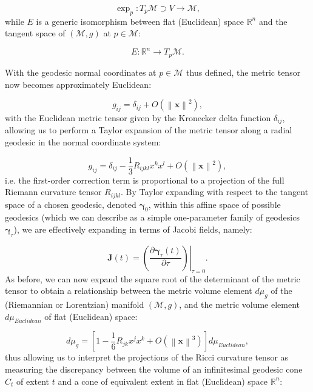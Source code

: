 \documentclass{article}
\begin{document}
\begin{equation}
\exp_p : T_p \mathcal{M} \supset V \to \mathcal{M},
\end{equation}
while $E$ is a generic isomorphism between flat (Euclidean) space ${\mathbb{R}^n}$ and the tangent space of ${\left( \mathcal{M}, g \right)}$ at ${p \in \mathcal{M}}$:

\begin{equation}
E : \mathbb{R}^n \to T_p \mathcal{M}.
\end{equation}

With the geodesic normal coordinates at ${p \in \mathcal{M}}$ thus defined, the metric tensor now becomes approximately Euclidean:

\begin{equation}
g_{i j} = \delta_{i j} + O \left( \left\lVert \mathbf{x} \right\rVert^2 \right),
\end{equation}
with the Euclidean metric tensor given by the Kronecker delta function ${\delta_{i j}}$, allowing us to perform a Taylor expansion of the metric tensor along a radial geodesic in the normal coordinate system:

\begin{equation}
g_{i j} = \delta_{i j} - \frac{1}{3} R_{i j k l} x^k x^l + O \left( \left\lVert \mathbf{x} \right\rVert^2 \right),
\end{equation}
i.e. the first-order correction term is proportional to a projection of the full Riemann curvature tensor ${R_{i j k l}}$. By Taylor expanding with respect to the tangent space of a chosen geodesic, denoted ${\boldsymbol\gamma_0}$, within this affine space of possible geodesics (which we can describe as a simple one-parameter family of geodesics ${\boldsymbol\gamma_{\tau}}$), we are effectively expanding in terms of Jacobi fields, namely:

\begin{equation}
\mathbf{J} \left( t \right) = \left. \left( \frac{\partial \boldsymbol\gamma_{\tau} \left( t \right)}{\partial \tau} \right) \right\rvert_{\tau = 0}.
\end{equation}
As before, we can now expand the square root of the determinant of the metric tensor to obtain a relationship between the metric volume element ${d \mu_g}$ of the (Riemannian or Lorentzian) manifold ${\left( \mathcal{M}, g \right)}$, and the metric volume element ${d \mu_{Euclidean}}$ of flat (Euclidean) space:

\begin{equation}
d \mu_g = \left[ 1 - \frac{1}{6} R_{j k} x^j x^k + O \left( \left\lVert \mathbf{x} \right\rVert^3 \right) \right] d \mu_{Euclidean},
\end{equation}
thus allowing us to interpret the projections of the Ricci curvature tensor as measuring the discrepancy between the volume of an infinitesimal geodesic cone ${C_t}$ of extent $t$ and a cone of equivalent extent in flat (Euclidean) space ${\mathbb{R}^n}$:
\end{document}
